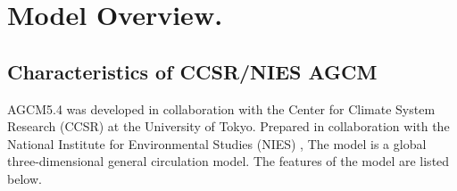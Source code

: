 \hypertarget{model-overview.}{%
\section{Model Overview.}\label{model-overview.}}

\hypertarget{characteristics-of-ccsrnies-agcm}{%
\subsection{Characteristics of CCSR/NIES
AGCM}\label{characteristics-of-ccsrnies-agcm}}

AGCM5.4 was developed in collaboration with the Center for Climate
System Research (CCSR) at the University of Tokyo. Prepared in
collaboration with the National Institute for Environmental Studies
(NIES) , The model is a global three-dimensional general circulation
model. The features of the model are listed below.

